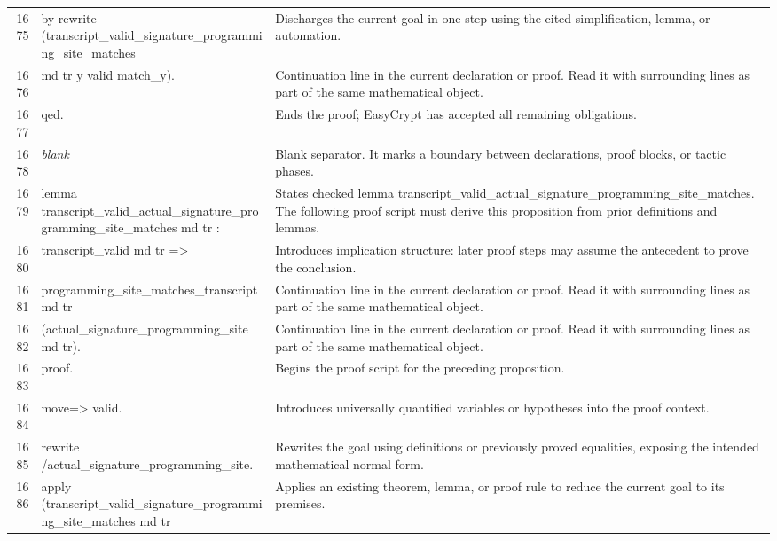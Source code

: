 \documentclass[10pt]{article}
\begin{document}
\begin{longtable}{r L{0.53\textwidth} L{0.37\textwidth}}
1675 & {\ttfamily\scriptsize by rewrite (transcript\_valid\_signature\_programming\_site\_matches} & Discharges the current goal in one step using the cited simplification, lemma, or automation. \\
1676 & {\ttfamily\scriptsize               md tr y valid match\_y).} & Continuation line in the current declaration or proof.  Read it with surrounding lines as part of the same mathematical object. \\
1677 & {\ttfamily\scriptsize qed.} & Ends the proof; EasyCrypt has accepted all remaining obligations. \\
1678 & {\ttfamily\scriptsize \emph{blank}} & Blank separator.  It marks a boundary between declarations, proof blocks, or tactic phases. \\
1679 & {\ttfamily\scriptsize lemma transcript\_valid\_actual\_signature\_programming\_site\_matches md tr :} & States checked lemma transcript\_valid\_actual\_signature\_programming\_site\_matches.  The following proof script must derive this proposition from prior definitions and lemmas. \\
1680 & {\ttfamily\scriptsize   transcript\_valid md tr =>} & Introduces implication structure: later proof steps may assume the antecedent to prove the conclusion. \\
1681 & {\ttfamily\scriptsize   programming\_site\_matches\_transcript md tr} & Continuation line in the current declaration or proof.  Read it with surrounding lines as part of the same mathematical object. \\
1682 & {\ttfamily\scriptsize     (actual\_signature\_programming\_site md tr).} & Continuation line in the current declaration or proof.  Read it with surrounding lines as part of the same mathematical object. \\
1683 & {\ttfamily\scriptsize proof.} & Begins the proof script for the preceding proposition. \\
1684 & {\ttfamily\scriptsize move=> valid.} & Introduces universally quantified variables or hypotheses into the proof context. \\
1685 & {\ttfamily\scriptsize rewrite /actual\_signature\_programming\_site.} & Rewrites the goal using definitions or previously proved equalities, exposing the intended mathematical normal form. \\
1686 & {\ttfamily\scriptsize apply (transcript\_valid\_signature\_programming\_site\_matches md tr} & Applies an existing theorem, lemma, or proof rule to reduce the current goal to its premises. \\

\end{longtable}
\end{document}
